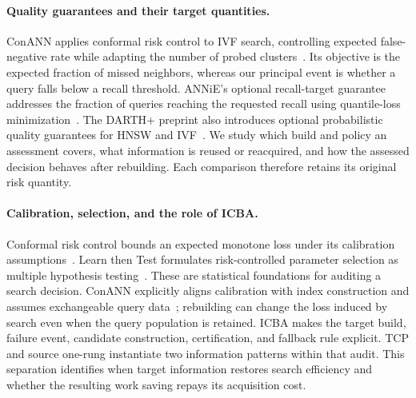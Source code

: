 \paragraph{Quality guarantees and their target quantities.}
ConANN applies conformal risk control to IVF search, controlling expected false-negative rate while adapting the number of probed clusters~\cite{horchidan2025conann}. Its objective is the expected fraction of missed neighbors, whereas our principal event is whether a query falls below a recall threshold. ANNiE's optional recall-target guarantee addresses the fraction of queries reaching the requested recall using quantile-loss minimization~\cite{wang2026annie}. The DARTH+ preprint also introduces optional probabilistic quality guarantees for HNSW and IVF~\cite{chatzakis2026darthplus}. We study which build and policy an assessment covers, what information is reused or reacquired, and how the assessed decision behaves after rebuilding. Each comparison therefore retains its original risk quantity.

\paragraph{Calibration, selection, and the role of ICBA.}
Conformal risk control bounds an expected monotone loss under its calibration assumptions~\cite{angelopoulos2024crc}. Learn then Test formulates risk-controlled parameter selection as multiple hypothesis testing~\cite{angelopoulos2021ltt}. These are statistical foundations for auditing a search decision. ConANN explicitly aligns calibration with index construction and assumes exchangeable query data~\cite{horchidan2025conann}; rebuilding can change the loss induced by search even when the query population is retained. ICBA makes the target build, failure event, candidate construction, certification, and fallback rule explicit. TCP and source one-rung instantiate two information patterns within that audit. This separation identifies when target information restores search efficiency and whether the resulting work saving repays its acquisition cost.
